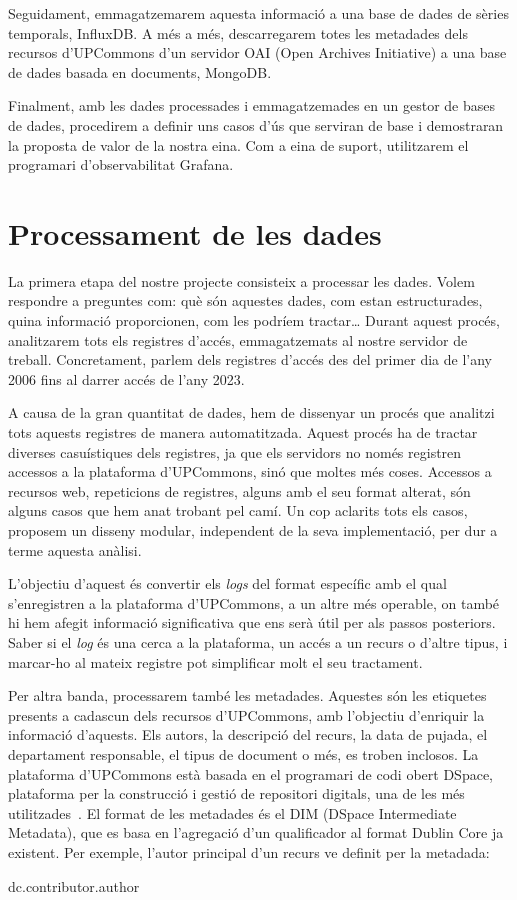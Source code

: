 \documentclass[lettersize,journal]{IEEEtran}
\begin{document}
Seguidament, emmagatzemarem aquesta informació a una base de dades de sèries temporals, InfluxDB.
A més a més, descarregarem totes les metadades dels recursos d’UPCommons d’un servidor OAI (Open Archives Initiative) a una base de dades basada en documents, MongoDB.

Finalment, amb les dades processades i emmagatzemades en un gestor de bases de dades, procedirem a definir uns casos d’ús que serviran de base i demostraran la proposta de valor de la nostra eina.
Com a eina de suport, utilitzarem el programari d’observabilitat Grafana.

\section{Processament de les dades}\label{sec:data-processing}
La primera etapa del nostre projecte consisteix a processar les dades.
Volem respondre a preguntes com: què són aquestes dades, com estan estructurades, quina informació proporcionen, com les podríem tractar\dots
Durant aquest procés, analitzarem tots els registres d'accés, emmagatzemats al nostre servidor de treball.
Concretament, parlem dels registres d'accés des del primer dia de l'any 2006 fins al darrer accés de l'any 2023.

A causa de la gran quantitat de dades, hem de dissenyar un procés que analitzi tots aquests registres de manera automatitzada.
Aquest procés ha de tractar diverses casuístiques dels registres, ja que els servidors no només registren accessos a la plataforma d'UPCommons, sinó que moltes més coses.
Accessos a recursos web, repeticions de registres, alguns amb el seu format alterat, són alguns casos que hem anat trobant pel camí.
Un cop aclarits tots els casos, proposem un disseny modular, independent de la seva implementació, per dur a terme aquesta anàlisi.

L'objectiu d'aquest és convertir els \textit{logs} del format específic amb el qual s'enregistren a la plataforma d'UPCommons, a un altre més operable, on també hi hem afegit informació significativa que ens serà útil per als passos posteriors.
Saber si el \textit{log} és una cerca a la plataforma, un accés a un recurs o d'altre tipus, i marcar-ho al mateix registre pot simplificar molt el seu tractament.

Per altra banda, processarem també les metadades.
Aquestes són les etiquetes presents a cadascun dels recursos d'UPCommons, amb l'objectiu d'enriquir la informació d'aquests.
Els autors, la descripció del recurs, la data de pujada, el departament responsable, el tipus de document o més, es troben inclosos.
La plataforma d'UPCommons està basada en el programari de codi obert DSpace, plataforma per la construcció i gestió de repositori digitals, una de les més utilitzades~\cite{eprints:roar}.
El format de les metadades és el DIM (DSpace Intermediate Metadata), que es basa en l'agregació d'un qualificador al format Dublin Core ja existent.
Per exemple, l'autor principal d'un recurs ve definit per la metadada:
\begin{center}
    {dc.contributor.author}
\end{center}
\end{document}
